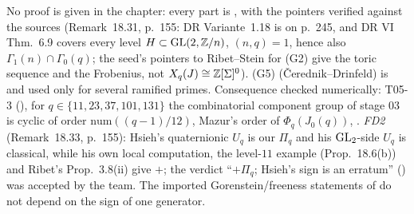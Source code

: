 \begin{outline}
No proof is given in the chapter: every part is \stcited, with the pointers verified against the sources (Remark~18.31, p.~155: DR
Variante~1.18 is on p.~245, and DR VI Thm.~6.9 covers every level $H\subset\mathrm{GL}(2,\mathbb{Z}/n)$, $(n,q)=1$, hence also $\Gamma_1(n)\cap\Gamma_0(q)$;
the seed's pointers to Ribet--Stein for (G2) give the toric sequence and the Frobenius, not $X_q(J)\cong\mathbb{Z}[\Sigma]^0$). (G5)
(Čerednik--Drinfeld) is \stcited{} \cite[Thm.~(5.2)]{BC} and used only for several ramified primes. Consequence checked numerically:
T05-3 (), for $q\in\{11,23,37,101,131\}$ the combinatorial component group of stage 03 is cyclic of order
$\mathrm{num}((q-1)/12)$, Mazur's order of $\Phi_q(J_0(q))$, \stcomp. \emph{FD2} (Remark~18.33, p.~155): Hsieh's quaternionic $U_q$ is our
$\Pi_q$ and his $\mathrm{GL}_2$-side $U_q$ is classical, while his own local computation, the level-$11$ example (Prop.~18.6(b)) and Ribet's
Prop.~3.8(ii) give $+$; the verdict ``$+\Pi_q$; Hsieh's sign is an erratum'' (\stpmc) was accepted by the team. The imported
Gorenstein/freeness statements of \cite{Hs} do not depend on the sign of one generator.
\end{outline}

